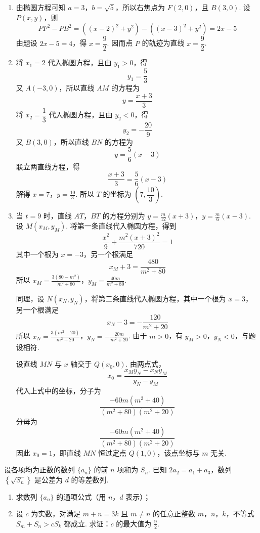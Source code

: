 \begin{solution}
\begin{enumerate}
\item 由椭圆方程可知 \(a=3\)，\(b=\sqrt{5}\)，所以右焦点为 \(F(2,0)\)，且 \(B(3,0)\). 设 \(P(x,y)\)，则
\[
PF^2-PB^2=\left((x-2)^2+y^2\right)-\left((x-3)^2+y^2\right)=2x-5
\]
由题设 \(2x-5=4\)，得 \(x=\dfrac{9}{2}\). 因而点 \(P\) 的轨迹为直线 \(x=\dfrac{9}{2}\).

\item 将 \(x_1=2\) 代入椭圆方程，且由 \(y_1>0\)，得
\[
y_1=\frac{5}{3}
\]
又 \(A(-3,0)\)，所以直线 \(AM\) 的方程为
\[
y=\frac{x+3}{3}
\]
将 \(x_2=\dfrac{1}{3}\) 代入椭圆方程，且由 \(y_2<0\)，得
\[
y_2=-\frac{20}{9}
\]
又 \(B(3,0)\)，所以直线 \(BN\) 的方程为
\[
y=\frac{5}{6}(x-3)
\]
联立两直线方程，得
\[
\frac{x+3}{3}=\frac{5}{6}(x-3)
\]
解得 \(x=7\)，\(y=\frac{10}{3}\).
所以 \(T\) 的坐标为 \(\left(7,\dfrac{10}{3}\right)\).

\item 当 \(t=9\) 时，直线 \(AT\)，\(BT\) 的方程分别为 \(y=\frac{m}{12}(x+3)\)，\(y=\frac{m}{6}(x-3)\).
设 \(M(x_M,y_M)\). 将第一条直线代入椭圆方程，得到
\[
\frac{x^2}{9}+\frac{m^2(x+3)^2}{720}=1
\]
其中一个根为 \(x=-3\)，另一个根满足
\[
x_M+3=\frac{480}{m^2+80}
\]
所以
\(x_M=\frac{3(80-m^2)}{m^2+80}\)，\(y_M=\frac{40m}{m^2+80}\).

同理，设 \(N(x_N,y_N)\)，将第二条直线代入椭圆方程，其中一个根为 \(x=3\)，另一个根满足
\[
x_N-3=-\frac{120}{m^2+20}
\]
所以
\(x_N=\frac{3(m^2-20)}{m^2+20}\)，\(y_N=-\frac{20m}{m^2+20}\).
由于 \(m>0\)，有 \(y_M>0\)，\(y_N<0\)，与题设相符.

设直线 \(MN\) 与 \(x\) 轴交于 \(Q(x_0,0)\). 由两点式，
\[
x_0=\frac{x_My_N-x_Ny_M}{y_N-y_M}
\]
代入上式中的坐标，分子为
\[
\frac{-60m(m^2+40)}{(m^2+80)(m^2+20)}
\]
分母为
\[
\frac{-60m(m^2+40)}{(m^2+80)(m^2+20)}
\]
因此 \(x_0=1\)，即直线 \(MN\) 恒过定点 \(Q(1,0)\)，该点坐标与 \(m\) 无关.
\end{enumerate}
\end{solution}

\begin{problem}
设各项均为正数的数列 \(\{a_n\}\) 的前 \(n\) 项和为 \(S_n\). 已知 \(2a_2=a_1+a_3\)，数列 \(\left\{\sqrt{S_n}\right\}\) 是公差为 \(d\) 的等差数列.

\begin{enumerate}
\item 求数列 \(\{a_n\}\) 的通项公式（用 \(n\)，\(d\) 表示）；
\item 设 \(c\) 为实数，对满足 \(m+n=3k\) 且 \(m\neq n\) 的任意正整数 \(m\)，\(n\)，\(k\)，不等式 \(S_m+S_n>cS_k\) 都成立. 求证：\(c\) 的最大值为 \(\frac{9}{2}\).
\end{enumerate}
\end{problem}

